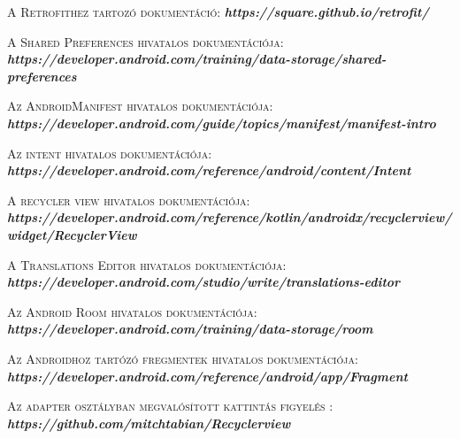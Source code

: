 \documentclass[
]{thesis-ekf}
\theoremstyle{definition}
\theoremstyle{remark}
\begin{document}
\begin{thebibliography}{2}
		\textsc{A Retrofithez tartozó dokumentáció:}
		\newline
		\emph{\bf{https://square.github.io/retrofit/}}
		
		\textsc{A Shared Preferences hivatalos dokumentációja:}
		\newline
		\emph{\bf{https://developer.android.com/training/data-storage/shared-preferences}}
		
		\textsc{Az AndroidManifest hivatalos dokumentációja:}
		\newline
		\emph{\bf{https://developer.android.com/guide/topics/manifest/manifest-intro}}
		
		\textsc{Az intent hivatalos dokumentációja:}
		\newline
		\emph{\bf{https://developer.android.com/reference/android/content/Intent}}
		
		\textsc{A recycler view hivatalos dokumentációja:}
		\newline
		\emph{\bf{https://developer.android.com/reference/kotlin/androidx/recyclerview/widget/RecyclerView}}
		
		\textsc{A Translations Editor hivatalos dokumentációja:}
		\newline
		\emph{\bf{https://developer.android.com/studio/write/translations-editor}}
		
		\textsc{Az Android Room hivatalos dokumentációja:}
		\newline
		\emph{\bf{https://developer.android.com/training/data-storage/room}}
		
		\textsc{Az Androidhoz tartózó fregmentek hivatalos dokumentációja:}
		\newline
		\emph{\bf{https://developer.android.com/reference/android/app/Fragment}}
		
		\textsc{Az adapter osztályban megvalósított kattintás figyelés :}
		\newline
		\emph{\bf{https://github.com/mitchtabian/Recyclerview}}
		
	\end{thebibliography}
	
\end{document}
